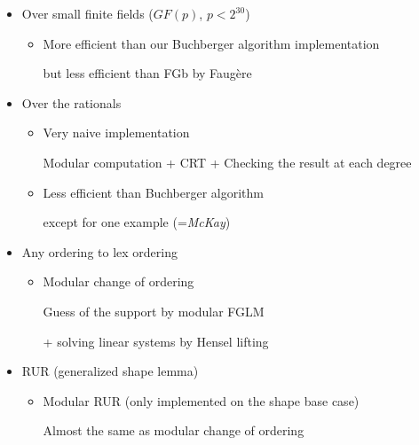 \documentclass{slides}
\begin{document}
\begin{slide}{}
\begin{itemize}
\item Over small finite fields ($GF(p)$, $p < 2^{30}$)
\begin{itemize}
\item More efficient than our Buchberger algorithm implementation

but less efficient than FGb by Faug\`ere
\end{itemize}

\item Over the rationals

\begin{itemize}
\item Very naive implementation

Modular computation + CRT + Checking the result at each degree

\item Less efficient than Buchberger algorithm

except for one example (={\it McKay})
\end{itemize}

\end{itemize}
\end{slide}

\begin{slide}{}

\begin{itemize}
\item Any ordering to lex ordering

\begin{itemize}
\item Modular change of ordering

Guess of the support by modular FGLM

+ solving linear systems by Hensel lifting

\end{itemize}

\item RUR (generalized shape lemma)

\begin{itemize}
\item Modular RUR (only implemented on the shape base case)

Almost the same as modular change of ordering
\end{itemize}

\end{itemize}
\end{slide}
\end{document}
